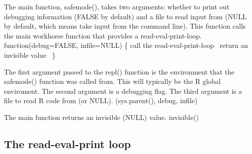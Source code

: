 \documentclass[a4paper]{article}%
\begin{document}
The main function, {\Tt{}safemode()\nwendquote},
takes two arguments: whether to print out debugging information
({\Tt{}FALSE\nwendquote} by default) and a file to read input from ({\Tt{}NULL\nwendquote} by default,
which means take input from the command line).  
This function
calls the main workhorse function that
provides a read-eval-print-loop.
\nwenddocs{}\endmoddef\nwstartdeflinemarkup{}\nwenddeflinemarkup
function(debug=FALSE, infile=NULL) \{
    \LA{}call the read-eval-print-loop~{\nwtagstyle{}}\RA{}
    \LA{}return an invisible value~{\nwtagstyle{}}\RA{}
\}
\nwendcode{}%

The first
argument passed to the {\Tt{}repl()\nwendquote} function is the environment that
the {\Tt{}safemode()\nwendquote} function was called from.  This will typically
be the R global enviroment.  The second argument is a debugging flag.
The third argument is a file to read R code from (or {\Tt{}NULL\nwendquote}).
\nwenddocs{}\endmoddef\nwstartdeflinemarkup{}\nwenddeflinemarkup
{}(sys.parent(), debug, infile)
\nwendcode{}%

The main function returns an
invisible ({\Tt{}NULL\nwendquote}) value.
\nwenddocs{}\endmoddef\nwstartdeflinemarkup{}\nwenddeflinemarkup
invisible()
\nwendcode{}\nwdocspar

\subsection{The read-eval-print loop}
\label{sec:the-read-eval-print-loop}
\end{document}
